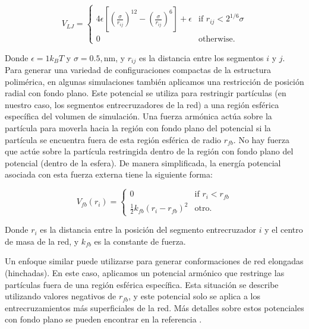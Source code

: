 \begin{equation}
	V_{LJ}=\begin{cases}
		4\epsilon \left[\left(\frac{\sigma}{r_{ij}}\right)^{12} - \left(\frac{\sigma}{r_{ij}}\right)^{6}\right] + \epsilon & \text{if $r_{ij} < 2^{1/6}\sigma$}\\
		0 & \text{otherwise}.
	\end{cases}
\end{equation}



Donde $\epsilon = 1 k_BT$ y $\sigma = 0.5 , $nm, y $r_{ij}$ es la distancia entre los segmentos $i$ y $j$.
Para generar una variedad de configuraciones compactas de la estructura polim\'erica, en algunas simulaciones tambi\'en aplicamos una restricci\'on de posici\'on radial con fondo plano.
Este potencial se utiliza para restringir part\'iculas (en nuestro caso, los segmentos entrecruzadores de la red) a una regi\'on esf\'erica espec\'ifica del volumen de simulaci\'on.
Una fuerza arm\'onica act\'ua sobre la part\'icula para moverla hacia la regi\'on con fondo plano del potencial si la part\'icula se encuentra fuera de esta regi\'on esf\'erica de radio $r_{fb}$.
No hay fuerza que act\'ue sobre la part\'icula restringida dentro de la regi\'on con fondo plano del potencial (dentro de la esfera).
De manera simplificada, la energ\'ia potencial asociada con esta fuerza externa tiene la siguiente forma:

\begin{equation}
	V_{fb}(r_i)=\begin{cases}
		0 & \text{if $r_{i} < r_{fb}$}\\
		\frac{1}{2}k_{fb}\left(r_i -r_{fb}\right)^2 & \text{otro}.
	\end{cases}
\end{equation}


Donde $r_i$ es la distancia entre la posici\'on del segmento entrecruzador $i$ y el centro de masa de la red, y $k_{fb}$ es la constante de fuerza.

Un enfoque similar puede utilizarse para generar conformaciones de red elongadas (hinchadas). En este caso, aplicamos un potencial arm\'onico que restringe las part\'iculas fuera de una regi\'on esférica espec\'ifica. Esta situaci\'on se describe utilizando valores negativos de $r_{fb}$, y este potencial solo se aplica a los entrecruzamientos m\'as superficiales de la red. M\'as detalles sobre estos potenciales con fondo plano se pueden encontrar en la referencia \cite{GROMACSRestraints}.

